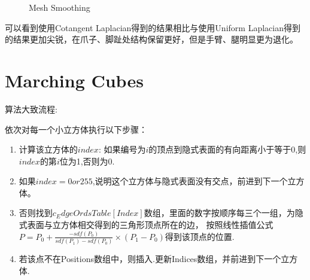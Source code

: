 \documentclass[12pt, a4paper]{ctexart}
\begin{document}
\begin{figure}[H]
    \hspace{0.5in}
    \caption{Mesh Smoothing}
\end{figure}

可以看到使用Cotangent Laplacian得到的结果相比与使用Uniform Laplacian得到的结果更加尖锐，在爪子、脚趾处结构保留更好，但是手臂、腿明显更为退化。

\section{Marching Cubes}
算法大致流程:

依次对每一个小立方体执行以下步骤：
\begin{enumerate}
    \item 计算该立方体的$index$: 如果编号为$i$的顶点到隐式表面的有向距离小于等于0,则$index$的第$i$位为1,否则为0.
    \item 如果$index = 0 or 255$,说明这个立方体与隐式表面没有交点，前进到下一个立方体。
    \item 否则找到$c_EdgeOrdsTable[Index]$数组，里面的数字按顺序每三个一组，为隐式表面与立方体相交得到的三角形顶点所在的边，
            按照线性插值公式$P =P_0 + \frac{-sdf(P_0)}{sdf(P_1) - sdf(P_0)} \times (P_1 - P_0)$得到该顶点的位置.
    \item 若该点不在Positions数组中，则插入.更新Indices数组，并前进到下一个立方体.
\end{enumerate}
\end{document}
